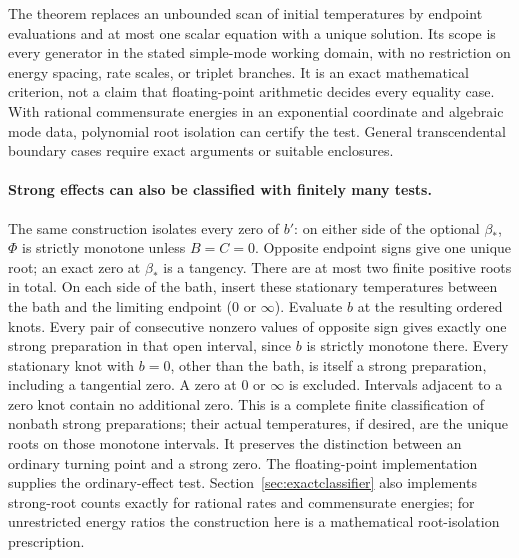 \documentclass[11pt]{article}
\begin{document}
The theorem replaces an unbounded scan of initial temperatures by endpoint
evaluations and at most one scalar equation with a unique solution. Its scope
is every generator in the stated simple-mode working domain, with no restriction
on energy spacing, rate scales, or triplet branches. It is an exact mathematical
criterion, not a claim that floating-point arithmetic decides every equality
case. With rational commensurate energies in an exponential coordinate and
algebraic mode data, polynomial root isolation can certify the test. General
transcendental boundary cases require exact arguments or suitable enclosures.

\paragraph{Strong effects can also be classified with finitely many tests.}
The same construction isolates every zero of $b'$: on either side of the
optional $\beta_*$, $\Phi$ is strictly monotone unless $B=C=0$. Opposite
endpoint signs give one unique root; an exact zero at $\beta_*$ is a tangency.
There are at most two finite positive roots in total. On each side of the
bath, insert these stationary temperatures between the bath and the limiting
endpoint ($0$ or $\infty$). Evaluate $b$ at the resulting ordered knots.
Every pair of consecutive nonzero values of opposite sign gives exactly one
strong preparation in that open interval, since $b$ is strictly monotone
there. Every stationary knot with $b=0$, other than the bath, is itself a
strong preparation, including a tangential zero. A zero at $0$ or $\infty$
is excluded. Intervals adjacent to a zero knot contain no additional zero.
This is a complete finite classification of nonbath strong preparations;
their actual temperatures, if desired, are the unique roots on those monotone
intervals. It preserves the distinction between an ordinary turning point and
a strong zero. The floating-point implementation supplies the ordinary-effect
test. Section~\ref{sec:exactclassifier} also implements strong-root counts
exactly for rational rates and commensurate energies; for unrestricted energy
ratios the construction here is a mathematical root-isolation prescription.
\end{document}
